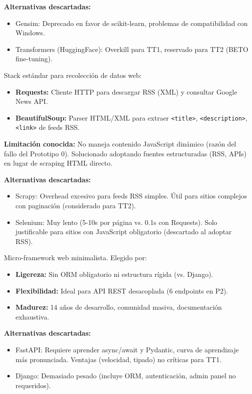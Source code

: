 \begin{description}
    \textbf{Alternativas descartadas:} 
    \begin{itemize}
        \item Gensim: Deprecado en favor de scikit-learn, problemas de compatibilidad con Windows.
        \item Transformers (HuggingFace): Overkill para TT1, reservado para TT2 (BETO fine-tuning).
    \end{itemize}
    
    \item[Requests 2.31+ \& BeautifulSoup4 4.12+] 
    Stack estándar para recolección de datos web:
    \begin{itemize}
        \item \textbf{Requests:} Cliente HTTP para descargar RSS (XML) y consultar Google News API.
        \item \textbf{BeautifulSoup:} Parser HTML/XML para extraer \texttt{<title>}, \texttt{<description>}, \texttt{<link>} de feeds RSS.
    \end{itemize}
    \textbf{Limitación conocida:} No maneja contenido JavaScript dinámico (razón del fallo del Prototipo 0). Solucionado adoptando fuentes estructuradas (RSS, APIs) en lugar de scraping HTML directo.
    
    \textbf{Alternativas descartadas:}
    \begin{itemize}
        \item Scrapy: Overhead excesivo para feeds RSS simples. Útil para sitios complejos con paginación (considerado para TT2).
        \item Selenium: Muy lento (5-10s por página vs. 0.1s con Requests). Solo justificable para sitios con JavaScript obligatorio (descartado al adoptar RSS).
    \end{itemize}
    
    \item[Flask 3.0] 
    Micro-framework web minimalista. Elegido por:
    \begin{itemize}
        \item \textbf{Ligereza:} Sin ORM obligatorio ni estructura rígida (vs. Django).
        \item \textbf{Flexibilidad:} Ideal para API REST desacoplada (6 endpoints en P2).
        \item \textbf{Madurez:} 14 años de desarrollo, comunidad masiva, documentación exhaustiva.
    \end{itemize}
    \textbf{Alternativas descartadas:}
    \begin{itemize}
        \item FastAPI: Requiere aprender async/await y Pydantic, curva de aprendizaje más pronunciada. Ventajas (velocidad, tipado) no críticas para TT1.
        \item Django: Demasiado pesado (incluye ORM, autenticación, admin panel no requeridos).
    \end{itemize}
    

\end{description}

